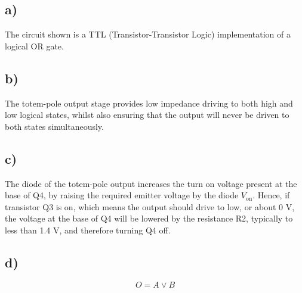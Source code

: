 \subsection*{a)}
	The circuit shown is a TTL (Transistor-Transistor Logic) implementation of a logical OR gate.
\subsection*{b)}
	The totem-pole output stage provides low impedance driving to both high and low logical states, whilst also ensuring that the output will never be driven to both states simultaneously.
\subsection*{c)}
	The diode of the totem-pole output increases the turn on voltage present at the base of Q4, by raising the required emitter voltage by the diode $V_\mathrm{on}$. Hence, if transistor Q3 is on, which means the output should drive to low, or about 0 V, the voltage at the base of Q4 will be lowered by the resistance R2, typically to less than 1.4 V, and therefore turning Q4 off.
\subsection*{d)}
	$$ O = A \lor B $$
	